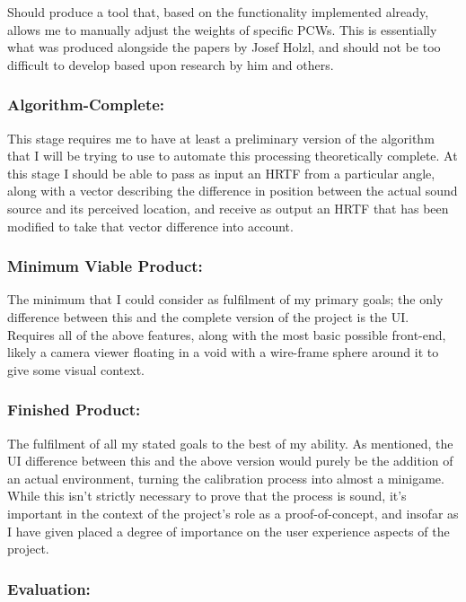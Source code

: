 \documentclass[10pt, oneside, a4paper, draft]{scrartcl}
\begin{document}
Should produce a tool that, based on the functionality implemented already, allows me to manually adjust the weights of specific PCWs. This is essentially what was produced alongside the papers by Josef Holzl\citep{Holzl2014a}, and should not be too difficult to develop based upon research by him and others. 

\subsubsection*{Algorithm-Complete:}

This stage requires me to have at least a preliminary version of the algorithm that I will be trying to use to automate this processing theoretically complete. At this stage I should be able to pass as input an HRTF from a particular angle, along with a vector describing the difference in position between the actual sound source and its perceived location, and receive as output an HRTF that has been modified to take that vector difference into account.

\subsubsection*{Minimum Viable Product:}

The minimum that I could consider as fulfilment of my primary goals; the only difference between this and the complete version of the project is the UI. Requires all of the above features, along with the most basic possible front-end, likely a camera viewer floating in a void with a wire-frame sphere around it to give some visual context. 

\subsubsection*{Finished Product:}

The fulfilment of all my stated goals to the best of my ability. As mentioned, the UI difference between this and the above version would purely be the addition of an actual environment, turning the calibration process into almost a minigame. While this isn't strictly necessary to prove that the process is sound, it's important in the context of the project's role as a proof-of-concept, and insofar as I have given placed a degree of importance on the user experience aspects of the project. 

\subsubsection*{Evaluation:}
\end{document}
